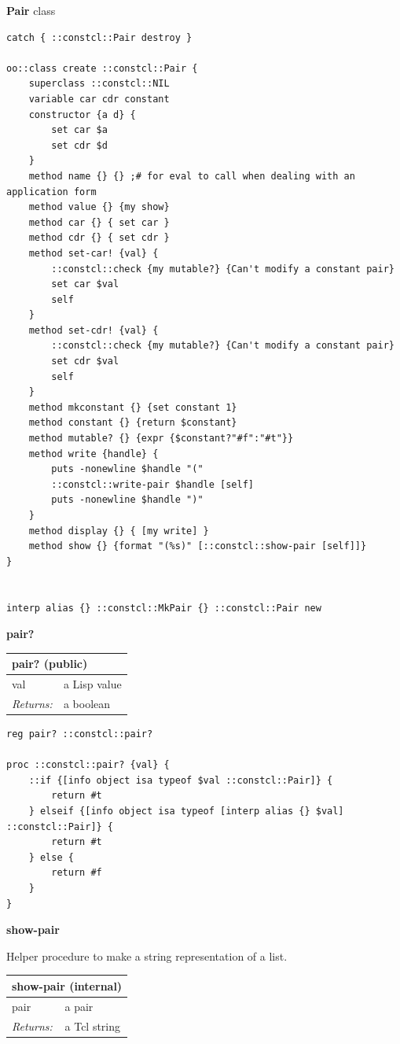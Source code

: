 \documentclass[twoside,9pt]{report}
\begin{document}
\textbf{Pair} class

\noindent\makebox[\linewidth]{\rule{\linewidth}{0.4pt}}
\begin{lstlisting}
catch { ::constcl::Pair destroy }
 
oo::class create ::constcl::Pair {
    superclass ::constcl::NIL
    variable car cdr constant
    constructor {a d} {
        set car $a
        set cdr $d
    }
    method name {} {} ;# for eval to call when dealing with an application form
    method value {} {my show}
    method car {} { set car }
    method cdr {} { set cdr }
    method set-car! {val} {
        ::constcl::check {my mutable?} {Can't modify a constant pair}
        set car $val
        self
    }
    method set-cdr! {val} {
        ::constcl::check {my mutable?} {Can't modify a constant pair}
        set cdr $val
        self
    }
    method mkconstant {} {set constant 1}
    method constant {} {return $constant}
    method mutable? {} {expr {$constant?"#f":"#t"}}
    method write {handle} {
        puts -nonewline $handle "("
        ::constcl::write-pair $handle [self]
        puts -nonewline $handle ")"
    }
    method display {} { [my write] }
    method show {} {format "(%s)" [::constcl::show-pair [self]]}
}
 
 
interp alias {} ::constcl::MkPair {} ::constcl::Pair new
\end{lstlisting}
\noindent\makebox[\linewidth]{\rule{\linewidth}{0.4pt}}

\textbf{pair?}

\begin{tabular}{ |l l| }
\hline
\multicolumn{2}{|l|}{pair? (public)} \\
\hline
val & a Lisp value \\
\textit{Returns:} & a boolean \\
\hline
\end{tabular}

\noindent\makebox[\linewidth]{\rule{\linewidth}{0.4pt}}
\begin{lstlisting}
reg pair? ::constcl::pair?
 
proc ::constcl::pair? {val} {
    ::if {[info object isa typeof $val ::constcl::Pair]} {
        return #t
    } elseif {[info object isa typeof [interp alias {} $val] ::constcl::Pair]} {
        return #t
    } else {
        return #f
    }
}
\end{lstlisting}
\noindent\makebox[\linewidth]{\rule{\linewidth}{0.4pt}}

\textbf{show-pair}


Helper procedure to make a string representation of a list.

\begin{tabular}{ |l l| }
\hline
\multicolumn{2}{|l|}{show-pair (internal)} \\
\hline
pair & a pair \\
\textit{Returns:} & a Tcl string \\
\hline
\end{tabular}
\end{document}
